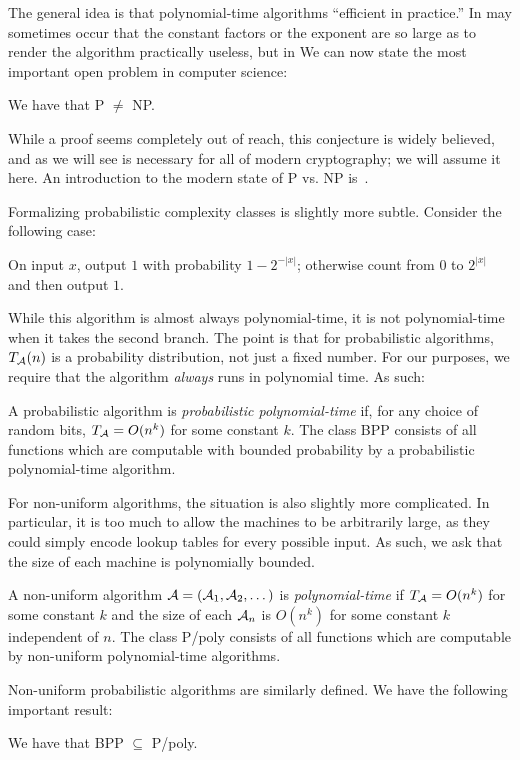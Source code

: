 The general idea is that polynomial-time algorithms ``efficient in practice.'' In may
sometimes occur that the constant factors or the exponent are so large as to
render the algorithm practically useless, but in  We can now state the most important open problem in computer science:

\begin{conj}
  We have that P $\neq$ NP.
\end{conj}

While a proof seems completely out of reach, this conjecture is widely
believed, and as we will see is necessary for all of modern cryptography; we
will assume it here. An introduction to the modern state of P vs. NP
is~\cite{anderson-2017}.

Formalizing probabilistic complexity classes is slightly more subtle. Consider
the following case:
\begin{_algo}
  On input $x$, output $1$ with probability $1 - 2^{-|x|}$; otherwise count from
  $0$ to $2^{|x|}$ and then output $1$.
\end{_algo}

While this algorithm is almost always polynomial-time, it is not polynomial-time
when it takes the second branch. The point is that for probabilistic algorithms,
$T_{\mathcal{A}}(n)$ is a probability distribution, not just a fixed number. For our
purposes, we require that the algorithm \emph{always} runs in polynomial time.
As such:

\begin{dfn}
  A probabilistic algorithm is \emph{probabilistic polynomial-time} if, for any
  choice of random bits, $T_{\mathcal{A}} = O(n^k)$ for some constant $k$. The class BPP
  consists of all functions which are computable with bounded probability by a
  probabilistic polynomial-time algorithm.
\end{dfn}

For non-uniform algorithms, the situation is also slightly more complicated. In
particular, it is too much to allow the machines to be arbitrarily large, as
they could simply encode lookup tables for every possible input. As such, we ask
that the size of each machine is polynomially bounded.

\begin{dfn}
  A non-uniform algorithm $\mathcal{A} = (\mathcal{A}_1, \mathcal{A}_2, \dots)$ is
  \emph{polynomial-time} if $T_{\mathcal{A}} = O(n^k)$ for some constant $k$ and the size
  of each $\mathcal{A}_n$ is $O(n^k)$ for some constant $k$ independent of $n$. The
  class P/poly consists of all functions which are computable by non-uniform
  polynomial-time algorithms.
\end{dfn}

Non-uniform probabilistic algorithms are similarly defined. We have the
following important result:

\begin{thm}\label{thm:adelman}
  We have that BPP $\subseteq$ P/poly.
\end{thm}
